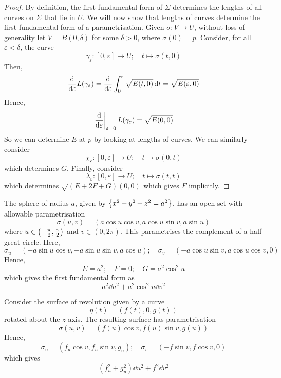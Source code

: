 \begin{proof}
	By definition, the first fundamental form of \( \Sigma \) determines the lengths of all curves on \( \Sigma \) that lie in \( U \).
	We will now show that lengths of curves determine the first fundamental form of a parametrisation.
	Given \( \sigma \colon V \to U \), without loss of generality let \( V = B(0,\delta) \) for some \( \delta > 0 \), where \( \sigma(0) = p \).
	Consider, for all \( \varepsilon < \delta \), the curve
	\[ \gamma_\varepsilon \colon [0,\varepsilon] \to U;\quad t \mapsto \sigma(t,0) \]
	Then,
	\[ \dv{\varepsilon} L(\gamma_\varepsilon) = \dv{\varepsilon} \int_0^\varepsilon \sqrt{E(t,0)} \dd{t} = \sqrt{E(\varepsilon,0)} \]
	Hence,
	\[ \eval{\dv{\varepsilon}}_{\varepsilon = 0} L(\gamma_\varepsilon) = \sqrt{E(0,0)} \]
	So we can determine \( E \) at \( p \) by looking at lengths of curves.
	We can similarly consider
	\[ \chi_\varepsilon \colon [0,\varepsilon] \to U;\quad t \mapsto \sigma(0,t) \]
	which determines \( G \).
	Finally, consider
	\[ \lambda_\varepsilon \colon [0,\varepsilon] \to U;\quad t \mapsto \sigma(t,t) \]
	which determines \( \sqrt{(E+2F+G)(0,0)} \) which gives \( F \) implicitly.
\end{proof}
\begin{example}
	The sphere of radius \( a \), given by \( \qty{x^2 + y^2 + z^2 = a^2} \), has an open set with allowable parametrisation
	\[ \sigma(u,v) = (a\cos u \cos v, a \cos u \sin v, a \sin u) \]
	where \( u \in \qty(-\frac{\pi}{2}, \frac{\pi}{2}) \) and \( v \in (0,2\pi) \).
	This parametrises the complement of a half great circle.
	Here,
	\[ \sigma_u = (-a \sin u \cos v, -a \sin u \sin v, a \cos u);\quad \sigma_v = (-a \cos u \sin v, a \cos u \cos v, 0) \]
	Hence,
	\[ E = a^2; \quad F = 0;\quad G = a^2 \cos^2 u \]
	which gives the first fundamental form as
	\[ a^2 \dd{u}^2 + a^2 \cos^2 u \dd{v}^2 \]
\end{example}
\begin{example}
	Consider the surface of revolution given by a curve
	\[ \eta(t) = (f(t),0,g(t)) \]
	rotated about the \( z \) axis.
	The resulting surface has parametrisation
	\[ \sigma(u,v) = (f(u) \cos v, f(u) \sin v, g(u)) \]
	Hence,
	\[ \sigma_u = (f_u \cos v, f_u \sin v, g_u);\quad \sigma_v = (-f \sin v, f \cos v, 0) \]
	which gives
	\[ (f_u^2 + g_u^2) \dd{u}^2 + f^2 \dd{v}^2 \]
\end{example}
